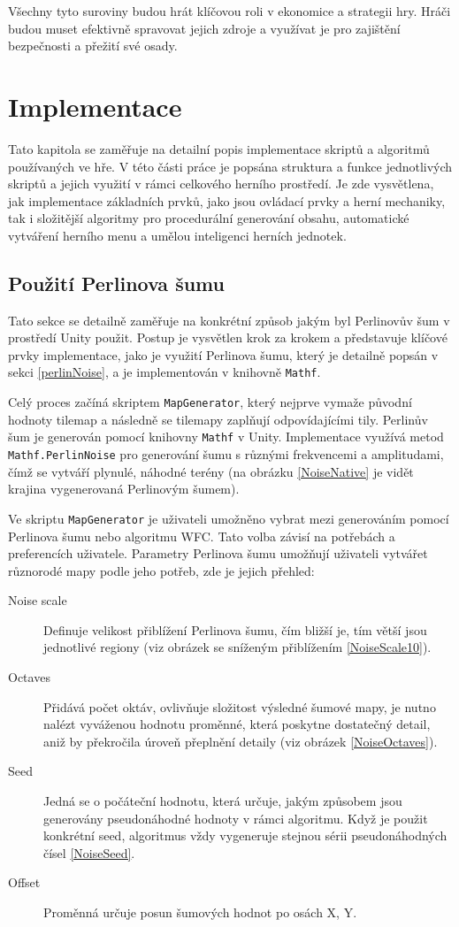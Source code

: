 Všechny tyto suroviny budou hrát klíčovou roli v ekonomice a strategii hry. Hráči budou muset efektivně spravovat jejich zdroje a využívat je pro zajištění bezpečnosti a přežití své osady.

\chapter{Implementace}
\label{implementace}
Tato kapitola se zaměřuje na detailní popis implementace skriptů a algoritmů používaných ve hře. V této části práce je popsána struktura a funkce jednotlivých skriptů a jejich využití v rámci celkového herního prostředí. Je zde vysvětlena, jak implementace základních prvků, jako jsou ovládací prvky a herní mechaniky, tak i složitější algoritmy pro procedurální generování obsahu, automatické vytváření herního menu a umělou inteligenci herních jednotek.

\section{Použití Perlinova šumu}

Tato sekce se detailně zaměřuje na konkrétní způsob jakým byl Perlinovův šum v prostředí Unity použit. Postup je vysvětlen krok za krokem a představuje klíčové prvky implementace, jako je využití Perlinova šumu, který je detailně popsán v sekci \ref{perlinNoise}, a je implementován v knihovně \texttt{Mathf}. 

Celý proces začíná skriptem \texttt{MapGenerator}, který nejprve vymaže původní hodnoty tilemap a následně se tilemapy zaplňují odpovídajícími tily. Perlinův šum je generován pomocí knihovny \texttt{Mathf} v Unity. Implementace využívá metod \texttt{Mathf.PerlinNoise} pro generování šumu s různými frekvencemi a amplitudami, čímž se vytváří plynulé, náhodné terény (na obrázku \ref{NoiseNative} je vidět krajina vygenerovaná Perlinovým šumem).

Ve skriptu \texttt{MapGenerator} je uživateli umožněno vybrat mezi generováním pomocí Perlinova šumu nebo algoritmu WFC. Tato volba závisí na potřebách a preferencích uživatele. Parametry Perlinova šumu umožňují uživateli vytvářet různorodé mapy podle jeho potřeb, zde je jejich přehled:
\begin{description}
	\item[Noise scale] Definuje velikost přiblížení Perlinova šumu, čím bližší je, tím větší jsou jednotlivé regiony (viz obrázek se sníženým přiblížením \ref{NoiseScale10}).
	\item[Octaves] Přidává počet oktáv, ovlivňuje složitost výsledné šumové mapy, je nutno nalézt vyváženou hodnotu proměnné, která poskytne dostatečný detail, aniž by překročila úroveň přeplnění detaily (viz obrázek \ref{NoiseOctaves}).
 	\item[Seed] Jedná se o počáteční hodnotu, která určuje, jakým způsobem jsou generovány pseudonáhodné hodnoty v rámci algoritmu. Když je použit konkrétní seed, algoritmus vždy vygeneruje stejnou sérii pseudonáhodných čísel \ref{NoiseSeed}.
 	\item[Offset] Proměnná určuje posun šumových hodnot po osách X, Y.
\end{description}

